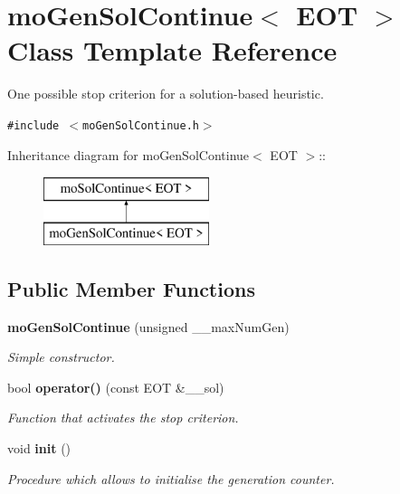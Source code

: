 \section{mo\-Gen\-Sol\-Continue$<$ EOT $>$ Class Template Reference}
\label{classmo_gen_sol_continue}
One possible stop criterion for a solution-based heuristic.  


{\tt \#include $<$mo\-Gen\-Sol\-Continue.h$>$}

Inheritance diagram for mo\-Gen\-Sol\-Continue$<$ EOT $>$::\begin{figure}[H]
\begin{center}
\leavevmode
\includegraphics[height=2cm]{classmo_gen_sol_continue}
\end{center}
\end{figure}
\subsection*{Public Member Functions}
\begin{CompactItemize}
\item 
{\bf mo\-Gen\-Sol\-Continue} (unsigned \_\-\_\-max\-Num\-Gen)
\begin{CompactList}\small\item\em Simple constructor. \item\end{CompactList}\item 
bool {\bf operator()} (const EOT \&\_\-\_\-sol)
\begin{CompactList}\small\item\em Function that activates the stop criterion. \item\end{CompactList}\item 
void {\bf init} ()
\begin{CompactList}\small\item\em Procedure which allows to initialise the generation counter. \item\end{CompactList}\end{CompactItemize}
